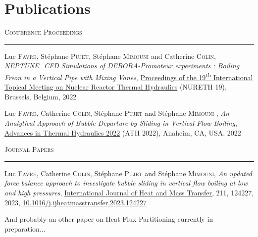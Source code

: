 

\chapter*{Publications} %

\npar
\npar


\textsc{Conference Proceedings}
\npar

\hrule

\npar
\npar

Luc \textsc{Favre}, Stéphane \textsc{Pujet}, Stéphane \textsc{Mimouni} and Catherine \textsc{Colin}, \textit{NEPTUNE\_CFD Simulations of DEBORA-Promoteur experiments : Boiling Freon in a Vertical Pipe with Mixing Vanes}, \ul{Proceedings of the 19\textsuperscript{th} International Topical Meeting on Nuclear Reactor Thermal Hydraulics} (NURETH 19), Brussels, Belgium, 2022

\npar
\npar

Luc \textsc{Favre}, Catherine \textsc{Colin}, Stéphane \textsc{Pujet} and Stéphane \textsc{Mimouni} , \textit{An Analytical Approach of Bubble Departure by Sliding in Vertical Flow Boiling}, \ul{Advances in Thermal Hydraulics 2022} (ATH 2022), Anaheim, CA, USA, 2022


\npar
\npar
\npar
\npar
\npar

\textsc{Journal Papers}
\npar

\hrule

\npar
\npar

Luc \textsc{Favre}, Catherine \textsc{Colin}, Stéphane \textsc{Pujet} and Stéphane \textsc{Mimouni}, \textit{An updated force balance approach to investigate bubble sliding in vertical flow boiling at low and high pressures}, \ul{International Journal of Heat and Mass Transfer}, 211, 124227, 2023, \url{10.1016/j.ijheatmasstransfer.2023.124227}

\npar
\npar

And probably an other paper on Heat Flux Partitioning currently in preparation... {\Large{ \smiley{} }}